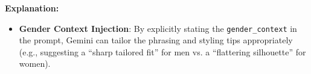 \textbf{Explanation:}
\begin{itemize}
    \item \textbf{Gender Context Injection}: By explicitly stating the \texttt{gender\_context} in the prompt, Gemini can tailor the phrasing and styling tips appropriately (e.g., suggesting a ``sharp tailored fit'' for men vs. a ``flattering silhouette'' for women).
\end{itemize}

